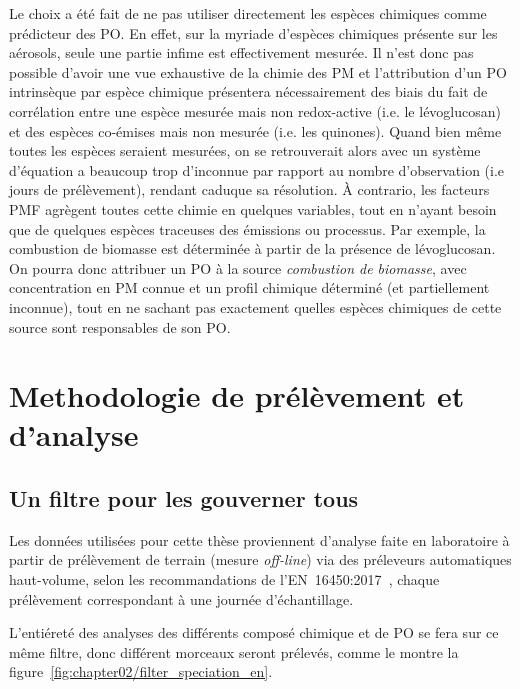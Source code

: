 Le choix a été fait de ne pas utiliser directement les espèces chimiques comme prédicteur
des PO. En effet, sur la myriade d'espèces chimiques présente sur les aérosols, seule une
partie infime est effectivement mesurée. Il n'est donc pas possible d'avoir une vue
exhaustive de la chimie des PM et l'attribution d'un PO intrinsèque par espèce chimique
présentera nécessairement des biais du fait de corrélation entre une espèce mesurée mais
non redox-active (i.e. le lévoglucosan) et des espèces co-émises mais non mesurée (i.e. les
quinones). Quand bien même toutes les espèces seraient mesurées, on se retrouverait alors
avec un système d'équation a beaucoup trop d'inconnue par rapport au nombre
d'observation (i.e jours de prélèvement), rendant caduque sa résolution.
À contrario, les facteurs PMF agrègent toutes cette chimie en quelques variables, tout en
n'ayant besoin que de quelques espèces traceuses des émissions ou processus. Par exemple,
la combustion de biomasse est déterminée à partir de la présence de lévoglucosan. On pourra
donc attribuer un PO à la source \textit{combustion de biomasse}, avec concentration en PM
connue et un profil chimique déterminé (et partiellement inconnue), tout en ne sachant
pas exactement quelles espèces chimiques de cette source sont responsables de son PO.



\section{Methodologie de prélèvement et d'analyse}%
\label{sec:methodologie_de_prélèvement_et_d_analyse}


\subsection{Un filtre pour les gouverner tous}%
\label{sub:un_filtre_pour_les_gouverner_tous}

Les données utilisées pour cette thèse proviennent d'analyse faite en laboratoire à
partir de prélèvement de terrain (mesure \textit{off-line}) via des préleveurs
automatiques haut-volume, selon les recommandations de
l'EN~16450:2017~\autocite{cenAmbient2017a}, chaque prélèvement correspondant à une
journée d'échantillage. 

L'entiéreté des analyses des différents composé chimique et de PO se fera sur ce même
filtre, donc différent morceaux seront prélevés, comme le montre la
figure~\ref{fig:chapter02/filter_speciation_en}.

